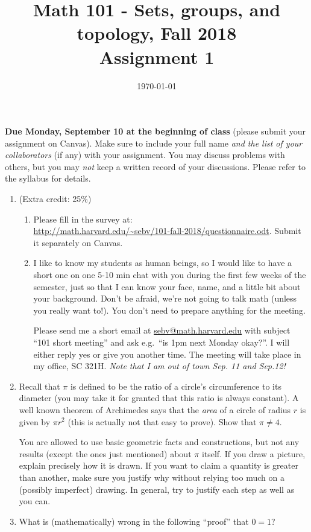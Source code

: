 \documentclass{amsart}
\title[Math 101, Fall 2018: assignment 1]{Math 101 - Sets, groups, and topology, Fall 2018 \\ Assignment 1}
\date{\today}
\theoremstyle{definition}
\begin{document}

\maketitle

\textbf{Due Monday, September 10 at the beginning of class} (please submit your assignment on Canvas). Make sure to include your full name \emph{and the list of your collaborators} (if any) with your assignment. You may discuss problems with others, but you may \emph{not} keep a written record of your discussions. Please refer to the syllabus for details.

\begin{enumerate}
\item (Extra credit: 25\%) \begin{enumerate}
\item Please fill in the survey at: \\
  \url{http://math.harvard.edu/~sebv/101-fall-2018/questionnaire.odt}. Submit it separately on Canvas.
\item I like to know my students as human beings, so I would like to have a short one on one 5-10 min chat with you during the first few weeks of the semester, just so that I can know your face, name, and a little bit about your background. Don't be afraid, we're not going to talk math (unless you really want to!). You don't need to prepare anything for the meeting.

  Please send me a short email at \url{sebv@math.harvard.edu} with subject ``101 short meeting'' and ask e.g.\ ``is 1pm next Monday okay?''. I will either reply yes or give you another time. The meeting will take place in my office, SC 321H. \emph{Note that I am out of town Sep. 11 and Sep.12!}
\end{enumerate}
\item Recall that $\pi$ is defined to be the ratio of a circle's circumference to its diameter (you may take it for granted that this ratio is always constant). A well known theorem of Archimedes says that the \emph{area} of a circle of radius $r$ is given by $\pi r^2$ (this is actually not that easy to prove). Show that $\pi \neq 4$. 

  You are allowed to use basic geometric facts and constructions, but not any results (except the ones just mentioned) about $\pi$ itself. If you draw a picture, explain precisely how it is drawn. If you want to claim a quantity is greater than another, make sure you justify why without relying too much on a (possibly imperfect) drawing. In general, try to justify each step as well as you can.
\item  What is (mathematically) wrong in the following ``proof'' that $0 = 1$?


\end{enumerate}
\end{document}
